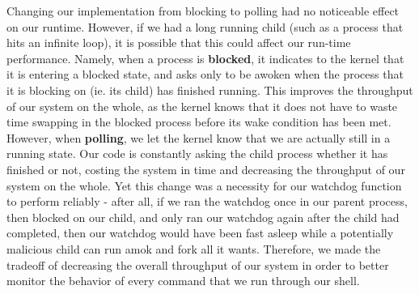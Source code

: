 \documentclass{article}
\begin{document}
Changing our implementation from blocking to polling had no noticeable effect
on our runtime. However, if we had a long running child (such as a process that
hits an infinite loop), it is possible that this could affect our run-time 
performance. Namely, when a process is \textbf{blocked}, it indicates to the 
kernel that it is entering a blocked state, and asks only to be awoken when
the process that it is blocking on (ie. its child) has finished running. This
improves the throughput of our system on the whole, as the kernel knows that it
does not have to waste time swapping in the blocked process before its wake
condition has been met.\\
However, when \textbf{polling}, we let the kernel know that we are actually 
still in a running state. Our code is constantly asking the child process 
whether it has finished or not, costing the system in time and decreasing the 
throughput of our system on the whole. Yet this change was a necessity for our 
watchdog function to perform reliably - after all, if we ran the watchdog once 
in our parent process, then blocked on our child, and only ran our watchdog 
again after the child had completed, then our watchdog would have been fast 
asleep while a potentially malicious child can run amok and fork all it wants. 
Therefore, we made the tradeoff of decreasing the overall throughput of our
system in order to better monitor the behavior of every command that we run
through our shell. \\


\end{document}
